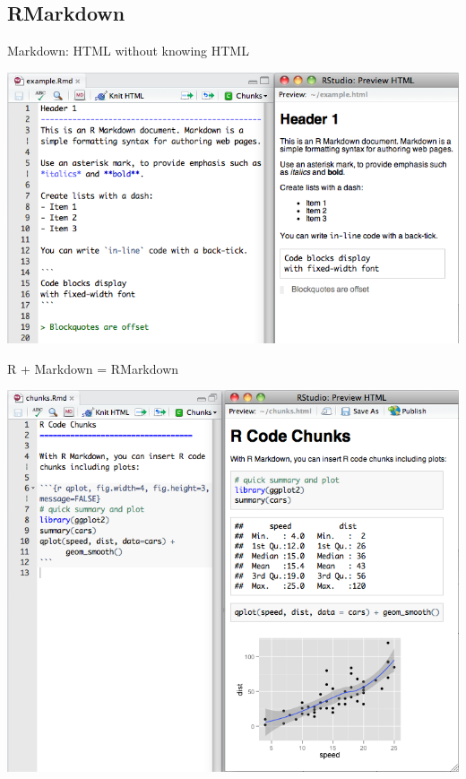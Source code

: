 \documentclass[10pt]{beamer}\usepackage[]{graphicx}\usepackage[]{color}
\begin{document}
\subsection{RMarkdown}

\begin{frame}{Markdown: HTML without knowing HTML}
\begin{center}
	\includegraphics[scale=0.45, keepaspectratio]{markdown}
\end{center}
\end{frame}

\begin{frame}{R + Markdown = RMarkdown}
\begin{center}
\includegraphics[scale=0.36, keepaspectratio]{rmarkdown}
\end{center}
\end{frame}
\end{document}

